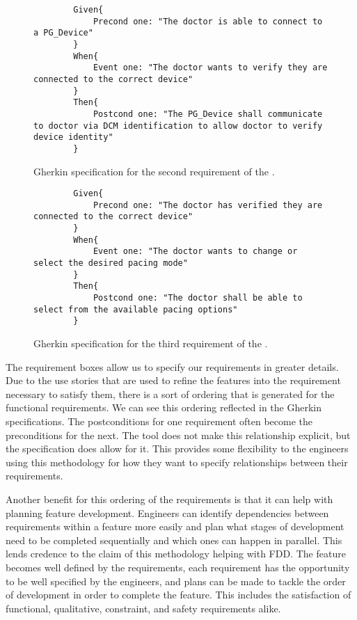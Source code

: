 \begin{figure}
	\begin{lstlisting}
		Given{
			Precond one: "The doctor is able to connect to a PG_Device"
		}
		When{
			Event one: "The doctor wants to verify they are connected to the correct device"
		}
		Then{
			Postcond one: "The PG_Device shall communicate to doctor via DCM identification to allow doctor to verify device identity"
		}
	\end{lstlisting}
	\caption{Gherkin specification for the second requirement of the \pgd.}
	\label{fig:req2_spec}
\end{figure}

\begin{figure}
	\begin{lstlisting}
		Given{
			Precond one: "The doctor has verified they are connected to the correct device"
		}
		When{
			Event one: "The doctor wants to change or select the desired pacing mode"
		}
		Then{
			Postcond one: "The doctor shall be able to select from the available pacing options"
		}
	\end{lstlisting}
	\caption{Gherkin specification for the third requirement of the \pgd.}
	\label{fig:req3_spec}
\end{figure}

The requirement boxes allow us to specify our requirements in greater details. Due to the use stories that are used to refine the features into the requirement necessary to satisfy them, there is a sort of ordering that is generated for the functional requirements. We can see this ordering reflected in the Gherkin specifications. The postconditions for one requirement often become the preconditions for the next. The tool does not make this relationship explicit, but the specification does allow for it. This provides some flexibility to the engineers using this methodology for how they want to specify relationships between their requirements. 

Another benefit for this ordering of the requirements is that it can help with planning feature development. Engineers can identify dependencies between requirements within a feature more easily and plan what stages of development need to be completed sequentially and which ones can happen in parallel. This lends credence to the claim of this methodology helping with FDD. The feature becomes well defined by the requirements, each requirement has the opportunity to be well specified by the engineers, and plans can be made to tackle the order of development in order to complete the feature. This includes the satisfaction of functional, qualitative, constraint, and safety requirements alike.

